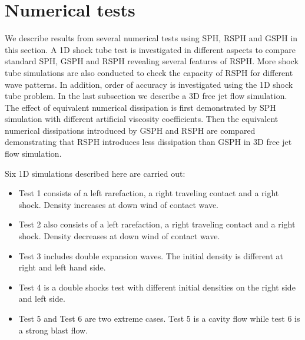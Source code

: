 \section{Numerical tests} \label{sec:numericaltests}
We describe results from several numerical tests using SPH, RSPH and GSPH in this section.
A 1D shock tube test is investigated in different aspects to compare standard SPH, GSPH and RSPH revealing several features of RSPH. More shock tube simulations are also conducted to check the capacity of RSPH for different wave patterns. In addition, order of accuracy is investigated using the 1D shock tube problem. In the last subsection we describe a 3D free jet flow simulation. The effect of equivalent numerical dissipation is first demonstrated by SPH simulation with different artificial viscosity coefficients. Then the equivalent numerical dissipations introduced by GSPH and RSPH are compared demonstrating that RSPH introduces less dissipation than GSPH in 3D free jet flow simulation.

Six 1D simulations described here are carried out:
\begin{itemize}%
\item Test 1 consists of a left rarefaction, a right traveling contact and a right shock. Density increases at down wind of contact wave. 
\item Test 2 also consists of a left rarefaction, a right traveling contact and a right shock. Density decreases at down wind of contact wave. 
\item Test 3 includes double expansion waves. The initial density is different at right and left hand side. 
\item Test 4 is a double shocks test with different initial densities on the right side and left side.
\item Test 5 and Test 6 are two extreme cases. Test 5 is a cavity flow while test 6 is a strong blast flow.
\end{itemize}

